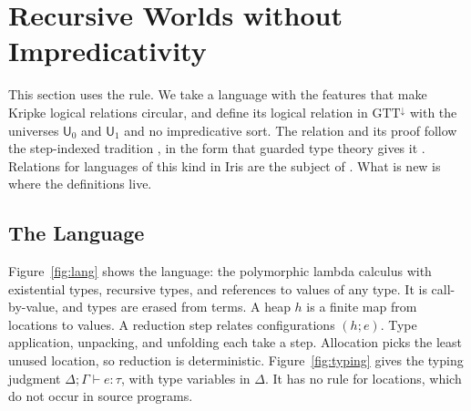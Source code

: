 \documentclass[acmsmall,nonacm,screen]{acmart}
\newcommand{\Uv}{\mathsf{U}}
\begin{document}
\section{Recursive Worlds without Impredicativity}\label{sec:worlds}

This section uses the rule. We take a language with the features that make Kripke logical
relations circular, and define its logical relation in $\mathrm{GTT}^{\downarrow}$ with the
universes $\Uv_0$ and $\Uv_1$ and no impredicative sort. The relation and its proof follow
the step-indexed tradition \citep{Ahmed2004,Ahmed2006,ADR2009,DAB2011}, in the form that
guarded type theory gives it \citep{BMSS2012}. Relations for languages of this kind in Iris
are the subject of \citet{Timany2024}. What is new is where the definitions live.

\subsection{The Language}

Figure~\ref{fig:lang} shows the language: the polymorphic lambda calculus with existential
types, recursive types, and references to values of any type. It is call-by-value, and
types are erased from terms. A heap $h$ is a finite map from locations to values. A
reduction step relates configurations $(h;e)$. Type application, unpacking, and unfolding
each take a step. Allocation picks the least unused location, so reduction is
deterministic. Figure~\ref{fig:typing} gives the typing judgment
$\Delta;\Gamma \vdash e : \tau$, with type variables in $\Delta$. It has no rule for
locations, which do not occur in source programs.
\end{document}
